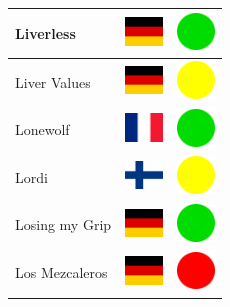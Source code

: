 \documentclass[12pt, a4paper, twoside]{report}
\begin{document}
\begin{center}
\begin{longtable}{|p{5cm}|p{2cm}|p{2cm}|}
 Liverless                                                  & \includegraphics[width=1cm]{../4x3/de} &   \includegraphics[width=1cm]{../likes/y} \\ \hline
 Liver Values                                               & \includegraphics[width=1cm]{../4x3/de} &   \includegraphics[width=1cm]{../likes/m} \\ \hline
 Lonewolf                                                   & \includegraphics[width=1cm]{../4x3/fr} &   \includegraphics[width=1cm]{../likes/y} \\ \hline
 Lordi                                                      & \includegraphics[width=1cm]{../4x3/fi} &   \includegraphics[width=1cm]{../likes/m} \\ \hline
 Losing my Grip                                             & \includegraphics[width=1cm]{../4x3/de} &   \includegraphics[width=1cm]{../likes/y} \\ \hline
 Los Mezcaleros                                             & \includegraphics[width=1cm]{../4x3/de} &   \includegraphics[width=1cm]{../likes/n} \\ \hline

\end{longtable}
\end{center}
\end{document}
